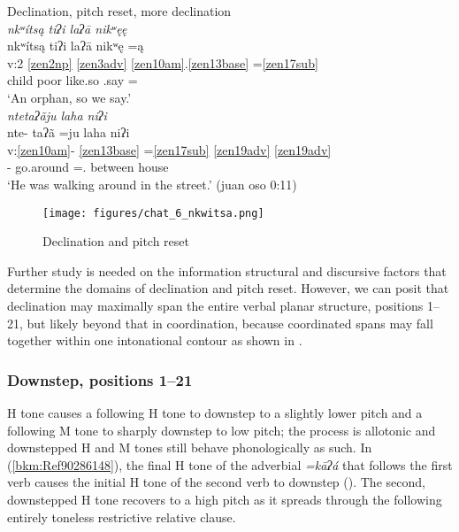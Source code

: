 \documentclass[output=paper]{langscibook}
\begin{document}
\ea\label{bkm:Ref90285149}Declination, pitch reset, more declination\\
\textit{nkʷítsą tiʔi laʔā nikʷęę} \\
\glll nkʷítsą tiʔi laʔā nikʷę =ą\\
v:2 \ref{zen2np} \ref{zen3adv} \ref{zen10am}.\ref{zen13base} =\ref{zen17sub} \\ 
     child poor like.so \Irr{}.say =\First\Incl{}\\
\glt `An orphan, so we say.' \\

\textit{ntetaʔãju laha niʔi} \\ 
\glll nte- taʔã =ju laha niʔi\\
v:\ref{zen10am}{}- \ref{zen13base} =\ref{zen17sub} \ref{zen19adv} \ref{zen19adv} \\ 
\Prog{}{}- go.around =\Third\Sg{}.\M{} between house\\
\glt `He was walking around in the street.' (juan oso 0:11)
\z

\begin{figure}[p]
    \centering
    \texttt{[image: figures/chat\_6\_nkwitsa.png]}
    \caption{Declination and pitch reset}
    \label{fig:chat:key:6}
\end{figure}


Further study is needed on the information structural and discursive factors that determine the domains of declination and pitch reset. However, we can posit that declination may maximally span the entire verbal planar structure, positions 1{}--21, but likely beyond that in coordination, because coordinated spans may fall together within one intonational contour as shown in .

\subsubsection{Downstep, positions 1{}--21}
\label{bkm:Ref96876657}\label{bkm:Ref113308426}
H tone causes a following H tone to downstep to a slightly lower pitch and a following M tone to sharply downstep to low pitch; the process is allotonic and downstepped H and M tones still behave phonologically as such. In (\ref{bkm:Ref90286148}), the final H tone of the adverbial \textit{=kāʔá} that follows the first verb causes the initial H tone of the second verb to downstep (). The second, downstepped H tone recovers to a high pitch as it spreads through the following entirely toneless restrictive relative clause.
\end{document}
